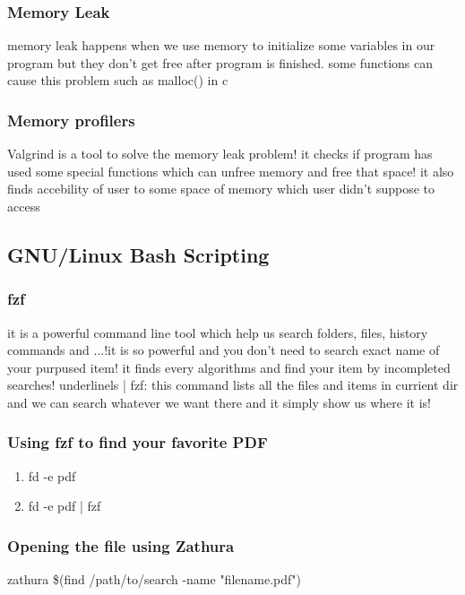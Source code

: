 \documentclass[titlepage]{article}
\begin{document}
\subsubsection{Memory Leak}
memory leak happens when we use memory to initialize some variables in our program but they don't get free after program is finished. some functions can cause this problem such as malloc() in c
\subsubsection{Memory profilers}
Valgrind is a tool to solve the memory leak problem! it checks if program has used some special functions which can unfree memory and free that space! it also finds accebility of user to some space of memory which user didn't suppose to access
\subsection{GNU/Linux Bash Scripting}
\subsubsection{fzf}
it is a powerful command line tool which help us search folders, files, history commands and ...!it is so powerful and you don't need to search exact name of your purpused item! it finds every algorithms and find your item by incompleted searches!\newline
underline{ls | fzf}:\newline
this command lists all the files and items in currient dir and we can search whatever we want there and it simply show us where it is!
\subsubsection{ Using fzf to find your favorite PDF}
\begin{enumerate}
    \item fd -e pdf
    \item fd -e pdf | fzf
\end{enumerate}
\subsubsection{Opening the file using Zathura}
zathura \$(find /path/to/search -name "filename.pdf")
\end{document}
